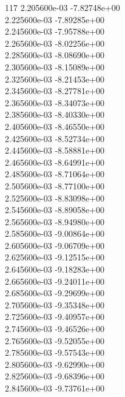 117	2.205600e-03	-7.82748e+00	\\ 	2.225600e-03	-7.89285e+00	\\ 	2.245600e-03	-7.95788e+00	\\ 	2.265600e-03	-8.02256e+00	\\ 	2.285600e-03	-8.08690e+00	\\ 	2.305600e-03	-8.15089e+00	\\ 	2.325600e-03	-8.21453e+00	\\ 	2.345600e-03	-8.27781e+00	\\ 	2.365600e-03	-8.34073e+00	\\ 	2.385600e-03	-8.40330e+00	\\ 	2.405600e-03	-8.46550e+00	\\ 	2.425600e-03	-8.52734e+00	\\ 	2.445600e-03	-8.58881e+00	\\ 	2.465600e-03	-8.64991e+00	\\ 	2.485600e-03	-8.71064e+00	\\ 	2.505600e-03	-8.77100e+00	\\ 	2.525600e-03	-8.83098e+00	\\ 	2.545600e-03	-8.89058e+00	\\ 	2.565600e-03	-8.94980e+00	\\ 	2.585600e-03	-9.00864e+00	\\ 	2.605600e-03	-9.06709e+00	\\ 	2.625600e-03	-9.12515e+00	\\ 	2.645600e-03	-9.18283e+00	\\ 	2.665600e-03	-9.24011e+00	\\ 	2.685600e-03	-9.29699e+00	\\ 	2.705600e-03	-9.35348e+00	\\ 	2.725600e-03	-9.40957e+00	\\ 	2.745600e-03	-9.46526e+00	\\ 	2.765600e-03	-9.52055e+00	\\ 	2.785600e-03	-9.57543e+00	\\ 	2.805600e-03	-9.62990e+00	\\ 	2.825600e-03	-9.68396e+00	\\ 	2.845600e-03	-9.73761e+00	\\ \hline

